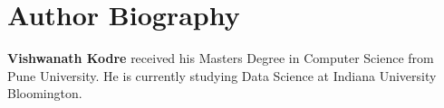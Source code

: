 \documentclass[9pt,twocolumn,twoside]{styles/osajnl}
\begin{document}

 
\section*{Author Biography}
\begingroup
\setlength\intextsep{0pt}
\begin{minipage}[t][3.2cm][t]{1.0\columnwidth} %
  \noindent
  {\bfseries Vishwanath Kodre} received his Masters Degree in Computer Science from Pune University.  He is currently studying Data Science at Indiana University Bloomington.
\end{minipage}
\endgroup
\end{document}
